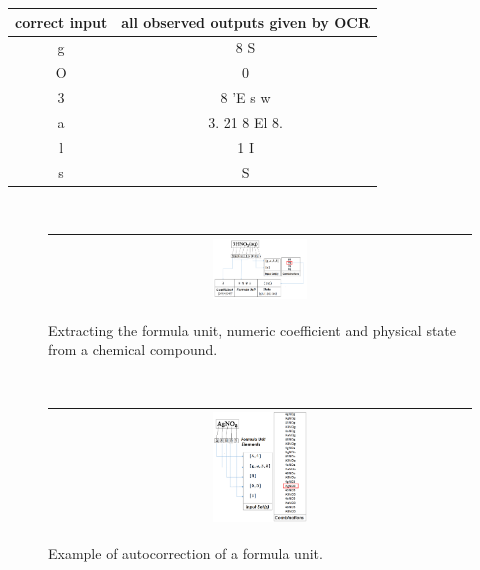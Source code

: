 \begin{table}
\begin{center}
 \begin{tabular}{|| c | c ||}
 \hline
 correct input & all observed outputs given by OCR\\
 \hline
 g & 8 S\\
 \hline
O & 0\\
\hline
3 & 8 'E s w \\
\hline
a & 3. 21 8 El 8. \\
\hline
l & 1 I\\
\hline
s & S\\
 \hline
 \end{tabular}
 \end{center}
 \label{table:errorTable}
 \end{table}

\begin{figure}[h]
\center\ 
\begin{tabular}{|c|} 
\hline
\includegraphics[width=0.23\textwidth]{stateCorrection.png}\\
\hline
\end{tabular} 
\caption{Extracting the formula unit, numeric coefficient and physical state from a chemical compound. }
\label{stateCorrection} 
\end{figure} 

\begin{figure}[h]
\center\ 
\begin{tabular}{|c|} 
\hline
\includegraphics[width=0.23\textwidth]{autoCorrectionPictorial.png}\\
\hline
\end{tabular} 
\caption{Example of autocorrection of a formula unit. }
\label{autoCorrection} 
\end{figure} 

 

